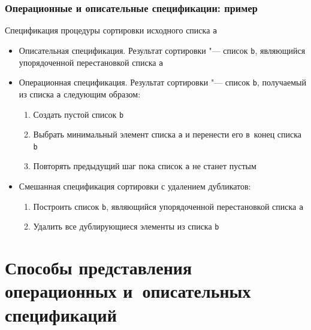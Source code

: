 \documentclass{softengineering-lectures}
\begin{document}
\begin{frame} \frametitle{Операционные и описательные спецификации: пример}

  Спецификация процедуры сортировки исходного списка \texttt{a}
  
  \begin{itemize}
  \item \alert{Описательная спецификация.} Результат сортировки "--- список
    \texttt{b}, являющийся упорядоченной перестановкой списка \texttt{a}
  \item \alert{Операционная спецификация.} Результат сортировки "--- список
    \texttt{b}, получаемый из списка \texttt{a} следующим образом:
    \begin{enumerate}
    \item Создать пустой список \texttt{b}
    \item Выбрать минимальный элемент списка \texttt{a} и перенести его в~конец
      списка \texttt{b}
    \item Повторять предыдущий шаг пока список \texttt{a} не станет пустым
    \end{enumerate}
  \item \alert{Смешанная спецификация} сортировки с удалением дубликатов:
    \begin{enumerate}
    \item Построить список \texttt{b}, являющийся упорядоченной перестановкой списка
      \texttt{a}
    \item Удалить все дублирующиеся элементы из списка \texttt{b}
    \end{enumerate}    
  \end{itemize}
  
\end{frame}


\section{Способы представления операционных и~описательных спецификаций}

\subsection{}
\end{document}

